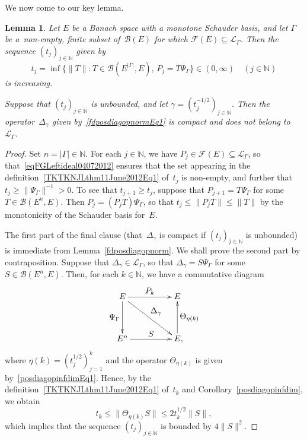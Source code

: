 \documentclass[12pt]{amsart}
\newtheorem{lemma}[theorem]{Lemma}
\theoremstyle{definition}
\numberwithin{equation}{section}
\begin{document}
We now come to our key lemma. 
\begin{lemma}\label{TKTKNJLthm11June2012}
  Let $E$ be a Banach space with a monotone Schauder
  basis, and let $\Gamma$ be a~non-empty, finite subset
  of~$\mathscr{B}(E)$ for which
  $\mathscr{F}(E)\subseteq\mathscr{L}_{\Gamma}$.  Then the sequence
  $(t_j)_{j\in{\ensuremath{\mathbb{N}}}}$ given by
  \begin{equation}\label{TKTKNJLthm11June2012Eq1}
    t_j = \inf\bigl\{\| T\| : T\in\mathscr{B}(E^{|\Gamma|},E),\, P_j =
    T\Psi_{\Gamma}\bigr\}\in(0,\infty) \quad
    (j\in{\ensuremath{\mathbb{N}}}) \end{equation} 
  is increasing.
  
  Suppose that $(t_j)_{j\in{\ensuremath{\mathbb{N}}}}$ is unbounded, and let $\gamma =
  (t_j^{-1/2})_{j\in{\ensuremath{\mathbb{N}}}}$. Then the operator~$\Delta_\gamma$ given
  by~\eqref{fdposdiagopnormEq1} is compact and does not belong
  to~$\mathscr{L}_{\Gamma}$. 
\end{lemma}
\begin{proof}
  Set $n=|\Gamma|\in{\ensuremath{\mathbb{N}}}$. For each $j\in{\ensuremath{\mathbb{N}}}$, we have
  $P_j\in\mathscr{F}(E)\subseteq\mathscr{L}_{\Gamma}$, so
  that~\eqref{eqFGLeftideal04072012} ensures that the set appearing in
  the definition~\eqref{TKTKNJLthm11June2012Eq1} of~$t_j$ is
  non-empty, and further that $t_j{\ensuremath{\geqslant}}\|\Psi_{\Gamma}\|^{-1}>0$.  To see that
  $t_{j+1}{\ensuremath{\geqslant}} t_j$, suppose that $P_{j+1} = T\Psi_{\Gamma}$ for some
  $T\in\mathscr{B}(E^n,E)$. Then $P_j = (P_jT)\Psi_{\Gamma}$, so that
  $t_j{\ensuremath{\leqslant}} \|P_jT\|{\ensuremath{\leqslant}} \|T\|$ by the monotonicity of the Schauder basis
  for~$E$.

  The first part of the final clause (that~$\Delta_\gamma$ is compact
  if $(t_j)_{j\in{\ensuremath{\mathbb{N}}}}$ is unbounded) is immediate from
  Lemma~\ref{fdposdiagopnorm}. We shall prove the second part by
  contraposition.  Suppose that
  $\Delta_\gamma\in\mathscr{L}_{\Gamma}$, so that $\Delta_\gamma =
  S\Psi_{\Gamma}$ for some $S\in\mathscr{B}(E^n,E)$.  Then, for each
  $k\in{\ensuremath{\mathbb{N}}}$, we have a commutative diagram
  \[ \spreaddiagramrows{3ex}\spreaddiagramcolumns{6ex}  \xymatrix{
    E\ar^-{\displaystyle{P_k}}[r]    \ar^-{\displaystyle{\Delta_\gamma}}[rd]    \ar_-{\displaystyle{\Psi_{\Gamma}}}[d]
    &E\\ E^n\ar^-{\displaystyle{S}}[r]
    &E{{\text{\makebox[0pt][l]{${,}$}}}}\ar_-{\displaystyle{\Theta_{\eta(k)}}}[u]} \] where
  $\eta(k) = (t_j^{1/2})_{j=1}^k$ and the operator $\Theta_{\eta(k)}$
  is given by~\eqref{posdiagopinfdimEq1}.  Hence, by the
  definition~\eqref{TKTKNJLthm11June2012Eq1} of~$t_k$ and
  Corollary~\ref{posdiagopinfdim}, we obtain
  \[ t_k{\ensuremath{\leqslant}} \|\Theta_{\eta(k)} S\|{\ensuremath{\leqslant}} 2t_k^{1/2}\|S\|, \] which
  implies that the sequence $(t_j)_{j\in{\ensuremath{\mathbb{N}}}}$ is bounded by $4\|S\|^2$.
\end{proof}
\end{document}
